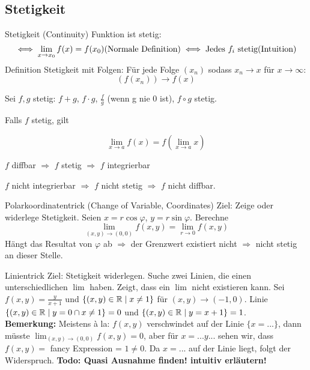 \subsection{Stetigkeit}

\begin{Definition}{Stetigkeit (Continuity)}{}
    Funktion ist stetig:
    \begin{equation*}
     \iff \lim_{x\rightarrow x_0} f(x) = f(x_0) \text{(Normale Definition)} \iff \text{Jedes $f_i$ stetig} \text{(Intuition)}\\
    \end{equation*}
    Definition Stetigkeit mit Folgen: Für jede Folge $(x_n)$ sodass $x_n \rightarrow x$ für $x\rightarrow \infty $:
    \[
    (f(x_n)) \rightarrow f(x)
    \]
\end{Definition}

Sei $f,g$ stetig: $f+g$, $f\cdot g$, $\frac{f}{g}$ (wenn g nie 0 ist), $f \circ g$ stetig.

Falls $f$ stetig, gilt

\[
    \lim_{x \rightarrow a} f(x) = f(\lim_{x\rightarrow a} x)
\]

$f$ diffbar $\Rightarrow$ $f$ stetig $\Rightarrow$ $f$ integrierbar

$f$ nicht integrierbar $\Rightarrow$ $f$ nicht stetig $\Rightarrow$ $f$ nicht diffbar.\\

\begin{Rezept}{Polarkoordinatentrick (Change of Variable, Coordinates)}{}
    Ziel: Zeige oder widerlege Stetigkeit. Seien $x=r\cos \varphi$, $y=r\sin \varphi$. Berechne
    \[
    \lim_{(x, y) \rightarrow (0,0)} f(x, y) = \lim_{r \rightarrow 0} f(x, y)
    \]
    Hängt das Resultat von $\varphi$ ab $\Rightarrow$ der Grenzwert existiert nicht $\Rightarrow$ nicht stetig an dieser Stelle.
\end{Rezept}

\begin{Rezept}{Linientrick}{}
    Ziel: Stetigkeit widerlegen. Suche zwei Linien, die einen unterschiedlichen $\lim$ haben. Zeigt, dass ein $\lim$ nicht existieren kann.
    Sei $f(x, y)=\frac{y}{x+1}$ und $\{(x, y) \in \mathbb{R} \mid x \neq 1\}$ für $(x, y) \rightarrow (-1, 0)$. Linie $\{(x, y) \in \mathbb{R} \mid y=0\cap x \neq 1\}=0$ und $\{(x, y) \in \mathbb{R} \mid y=x+1\}=1$.\\
    
    \textbf{Bemerkung:} Meistens à la: $f(x,y)$ verschwindet auf der Linie $\{x=...\}$, dann müsste $\lim_{(x,y)\rightarrow(0,0)} f(x,y) = 0$, aber für $x=...y...$ sehen wir, dass
    $f(x,y) =$ fancy Expression = $1 \neq 0$. Da $x=...$ auf der Linie liegt, folgt der Widerspruch. \textbf{Todo: Quasi Ausnahme finden! intuitiv erläutern!}
\end{Rezept}


